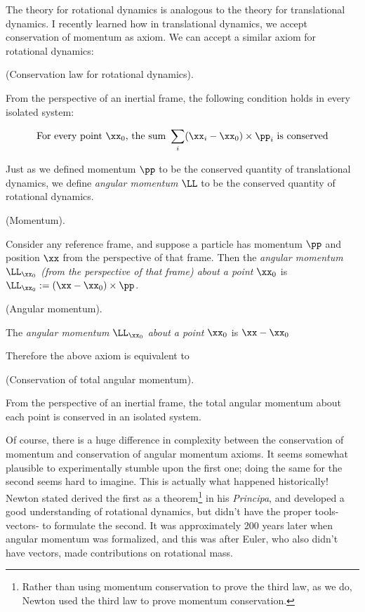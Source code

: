 \documentclass{article}
\begin{document}
The theory for rotational dynamics is analogous to the theory for translational dynamics. I recently learned how in translational dynamics, we accept conservation of momentum as axiom. We can accept a similar axiom for rotational dynamics:

\begin{axiom}
    (Conservation law for rotational dynamics).

    From the perspective of an inertial frame, the following condition holds in every isolated system:

    \begin{align*}
        \text{For every point $\xx_0$, the sum }  \sum_i (\xx_i - \xx_0) \times \pp_i \text{ is conserved}
    \end{align*}
\end{axiom}

Just as we defined momentum $\pp$ to be the conserved quantity of translational dynamics, we define \textit{angular momentum} $\LL$ to be the conserved quantity of rotational dynamics.

\begin{defn}
    (Momentum).

    Consider any reference frame, and suppose a particle has momentum $\pp$ and position $\xx$ from the perspective of that frame. Then the \textit{angular momentum $\LL_{\xx_0}$ (from the perspective of that frame) about a point $\xx_0$} is $\LL_{\xx_0} := (\xx - \xx_0) \times \pp$.
\end{defn}

\begin{defn}
    (Angular momentum).

    The \textit{angular momentum $\LL_{\xx_0}$ about a point $\xx_0$} is $\xx - \xx_0$    
\end{defn}

Therefore the above axiom is equivalent to

\begin{axiom}
    (Conservation of total angular momentum).

    From the perspective of an inertial frame, the total angular momentum about each point is conserved in an isolated system.
\end{axiom}

Of course, there is a huge difference in complexity between the conservation of momentum and conservation of angular momentum axioms. It seems somewhat plausible to experimentally stumble upon the first one; doing the same for the second seems hard to imagine. This is actually what happened historically! Newton stated derived the first as a theorem\footnote{Rather than using momentum conservation to prove the third law, as we do, Newton used the third law to prove momentum conservation.} in his \textit{Principa}, and developed a good understanding of rotational dynamics, but didn't have the proper tools- vectors- to formulate the second. It was approximately 200 years later when angular momentum was formalized, and this was after Euler, who also didn't have vectors, made contributions on rotational mass.
\end{document}
